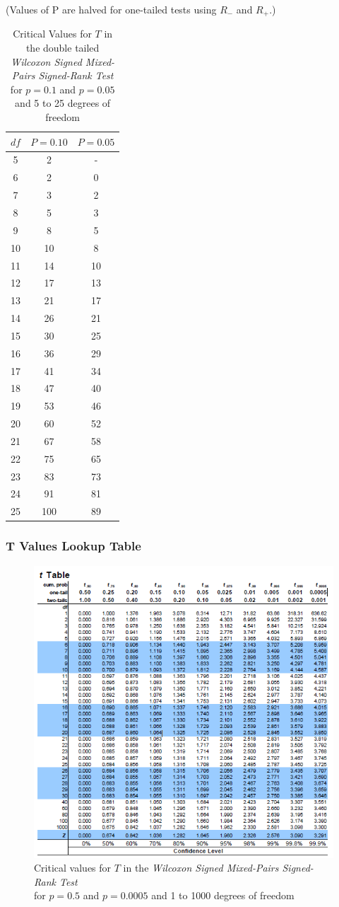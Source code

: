 (Values of P are halved for one-tailed tests using $R_-$ and $R_+$.)

\begin{table}[hbt]
  \begin{tabular}{c|cc}
    $df$ &  $P=0.10$ & $P=0.05$ \\
     \hline
    5 & 2 & - \\
    6 & 2 & 0 \\
    7 & 3 & 2 \\
    8 & 5 & 3 \\
    9 & 8 & 5 \\
    10 & 10 & 8 \\
    11 & 14 & 10 \\
    12 & 17 & 13 \\
    13 & 21 & 17 \\
    14 & 26 & 21 \\
    15 & 30 & 25 \\
    16 & 36 & 29 \\
    17 & 41 & 34 \\
    18 & 47 & 40 \\
    19 & 53 & 46 \\
    20 & 60 & 52 \\
    21 & 67 & 58 \\
    22 & 75 & 65 \\
    23 & 83 & 73 \\
    24 & 91 & 81 \\
    25 & 100 & 89
  \end{tabular}
  \caption{Critical Values for $T$ in the double tailed \emph{Wilcoxon Signed Mixed-Pairs Signed-Rank Test} \\ for $p = 0.1$ and $p=0.05$ and 5 to 25 degrees of freedom}
\end{table}
\subsubsection{T Values Lookup Table} 
\begin{figure}[hbt]
\includegraphics{t-vales.png}
\caption{Critical values for $T$ in the \emph{Wilcoxon Signed Mixed-Pairs Signed-Rank Test} \\ for $p = 0.5$ and $p=0.0005$ and 1 to 1000 degrees of freedom}
\end{figure}
